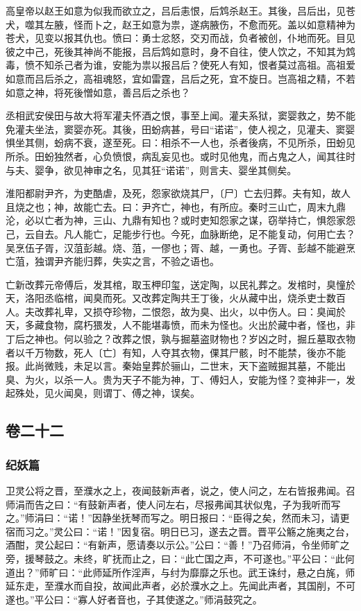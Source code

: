 \documentclass[]{article}
\begin{document}
高皇帝以赵王如意为似我而欲立之，吕后恚恨，后鸩杀赵王。其後，吕后出，见苍犬，噬其左腋，怪而卜之，赵王如意为祟，遂病腋伤，不愈而死。盖以如意精神为苍犬，见变以报其仇也。愤曰：勇士忿怒，交刃而战，负者被创，仆地而死。目见彼之中己，死後其神尚不能报，吕后鸩如意时，身不自往，使人饮之，不知其为鸩毒，愤不知杀己者为谁，安能为祟以报吕后？使死人有知，恨者莫过高祖。高祖爱如意而吕后杀之，高祖魂怒，宜如雷霆，吕后之死，宜不旋日。岂高祖之精，不若如意之神，将死後憎如意，善吕后之杀也？

丞相武安侯田与故大将军灌夫怀酒之恨，事至上闻。灌夫系狱，窦婴救之，势不能免灌夫坐法，窦婴亦死。其後，田蚡病甚，号曰``诺诺''，使人视之，见灌夫、窦婴惧坐其侧，蚡病不衰，遂至死。曰：相杀不一人也，杀者後病，不见所杀，田蚡见所杀。田蚡独然者，心负愤恨，病乱妄见也。或时见他鬼，而占鬼之人，闻其往时与夫、婴争，欲见神审之名，见其狂``诺诺''，则言夫、婴坐其侧矣。

淮阳都尉尹齐，为吏酷虐，及死，怨家欲烧其尸，〔尸〕亡去归葬。夫有知，故人且烧之也；神，故能亡去。曰：尹齐亡，神也，有所应。秦时三山亡，周末九鼎沦，必以亡者为神，三山、九鼎有知也？或时吏知怨家之谋，窃举持亡，惧怨家怨己，云自去。凡人能亡，足能步行也。今死，血脉断绝，足不能复动，何用亡去？吴烹伍子胥，汉菹彭越。烧、菹，一僇也；胥、越，一勇也。子胥、彭越不能避烹亡菹，独谓尹齐能归葬，失实之言，不验之语也。

亡新改葬元帝傅后，发其棺，取玉柙印玺，送定陶，以民礼葬之。发棺时，臭憧於天，洛阳丞临棺，闻臭而死。又改葬定陶共王丁後，火从藏中出，烧杀吏士数百人。夫改葬礼卑，又损夺珍物，二恨怨，故为臭、出火，以中伤人。曰：臭闻於天，多藏食物，腐朽猥发，人不能堪毒愤，而未为怪也。火出於藏中者，怪也，非丁后之神也。何以验之？改葬之恨，孰与掘墓盗财物也？岁凶之时，掘丘墓取衣物者以千万物数，死人〔亡〕有知，人夺其衣物，倮其尸骸，时不能禁，後亦不能报。此尚微贱，未足以言。秦始皇葬於骊山，二世末，天下盗贼掘其墓，不能出臭、为火，以杀一人。贵为天子不能为神，丁、傅妇人，安能为怪？变神非一，发起殊处，见火闻臭，则谓丁、傅之神，误矣。

\hypertarget{header-n809}{%
\subsection{卷二十二}\label{header-n809}}

\hypertarget{header-n810}{%
\subsubsection{纪妖篇}\label{header-n810}}

卫灵公将之晋，至濮水之上，夜闻鼓新声者，说之，使人问之，左右皆报弗闻。召师涓而告之曰：``有鼓新声者，使人问左右，尽报弗闻其状似鬼，子为我听而写之。''师涓曰：``诺！''因静坐抚琴而写之。明日报曰：``臣得之矣，然而未习，请更宿而习之。''灵公曰：``诺！''因复宿。明日已习，遂去之晋。晋平公觞之施夷之台，酒酣，灵公起曰：``有新声，愿请奏以示公。''公曰：``善！''乃召师涓，令坐师旷之旁，援琴鼓之。未终，旷抚而止之，曰：``此亡国之声，不可遂也。''平公曰：``此何道出？''师旷曰：``此师延所作淫声，与纣为靡靡之乐也。武王诛纣，悬之白旄，师延东走，至濮水而自投，故闻此声者，必於濮水之上。先闻此声者，其国削，不可遂也。''平公曰：``寡人好者音也，子其使遂之。''师涓鼓究之。
\end{document}
